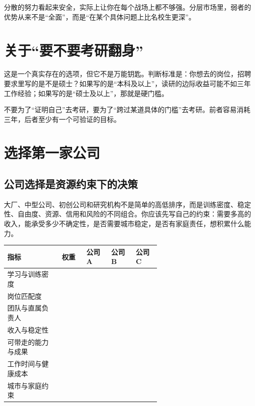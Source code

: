 \documentclass[UTF8,zihao=5,openany]{ctexbook}
\begin{document}
分散的努力看起来安全，实际上让你在每个战场上都不够强。分层市场里，弱者的优势从来不是“全面”，而是“在某个具体问题上比名校生更深”。

\section{关于“要不要考研翻身”}
这是一个真实存在的选项，但它不是万能钥匙。判断标准是：你想去的岗位，招聘要求里写的是不是硕士？如果写的是“本科及以上”，读研的边际收益可能不如三年工作经验；如果写的是“硕士及以上”，那就是硬门槛。

不要为了“证明自己”去考研，要为了“跨过某道具体的门槛”去考研。前者容易消耗三年，后者至少有一个可验证的目标。


\section{选择第一家公司}
\subsection{公司选择是资源约束下的决策}
大厂、中型公司、初创公司和研究机构不是简单的高低排序，而是训练密度、稳定性、自由度、资源、信用和风险的不同组合。你应该先写自己的约束：需要多高的收入，能承受多少不确定性，是否需要城市稳定，是否有家庭责任，想积累什么能力。

\begin{toolbox}
\begin{center}\footnotesize
\begin{tabularx}{0.94\linewidth}{p{0.22\linewidth}p{0.10\linewidth}p{0.10\linewidth}p{0.10\linewidth}p{0.10\linewidth}}
\toprule
指标 & 权重 & 公司 A & 公司 B & 公司 C \\
\midrule
学习与训练密度 & & & & \\
岗位匹配度 & & & & \\
团队与直属负责人 & & & & \\
收入与稳定性 & & & & \\
可带走的能力与成果 & & & & \\
工作时间与健康成本 & & & & \\
城市与家庭约束 & & & & \\
\bottomrule
\end{tabularx}
\end{center}
\end{toolbox}
\end{document}
